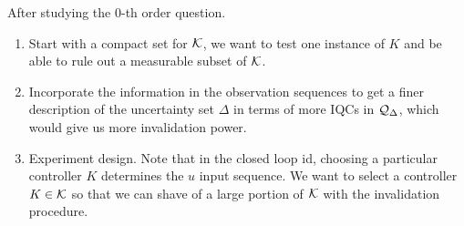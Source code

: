 \documentclass[11pt, onecolumn]{article}
\begin{document}
After studying the 0-th order question.
\begin{enumerate}
\item Start with a compact set for $\mathcal K$, we want to test one instance of $K$ and be able to rule
  out a measurable subset of $\mathcal K$.
\item Incorporate the information in the observation sequences to get a finer description of the
  uncertainty set $\Delta$ in terms of more IQCs in $\mathcal Q_{\Delta}$, which would give us more
  invalidation power.
\item Experiment design. Note that in the closed loop id, choosing a particular controller $K$
  determines the $u$ input sequence. We want to select a controller $K\in \mathcal K$ so that we can
  shave of a large portion of $\mathcal K$ with the invalidation procedure.
\end{enumerate}




\end{document}
